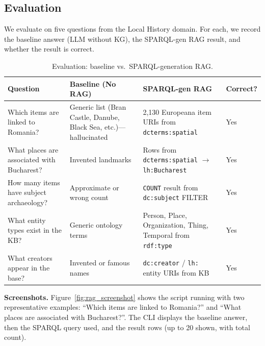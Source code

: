 \documentclass[11pt,a4paper]{article}
\begin{document}
  \subsection{Evaluation}

  We evaluate on five questions from the Local History domain. For each, we record the baseline answer (LLM without KG), the SPARQL-gen RAG result, and whether the result is correct.

  \begin{table}[ht]
  \centering
  \caption{Evaluation: baseline vs.\ SPARQL-generation RAG.}
  \begin{tabular}{p{3.8cm}p{3.2cm}p{3.8cm}l}
  \toprule
  \textbf{Question} & \textbf{Baseline (No RAG)} & \textbf{SPARQL-gen RAG} & \textbf{Correct?} \\
  \midrule
  Which items are linked to Romania? & Generic list (Bran Castle, Danube, Black Sea, etc.)---hallucinated & 2,130 Europeana item URIs from \texttt{dcterms:spatial} & Yes \\
  What places are associated with Bucharest? & Invented landmarks & Rows from \texttt{dcterms:spatial} $\rightarrow$ \texttt{lh:Bucharest} & Yes \\
  How many items have subject archaeology? & Approximate or wrong count & \texttt{COUNT} result from \texttt{dc:subject} FILTER & Yes \\
  What entity types exist in the KB? & Generic ontology terms & Person, Place, Organization, Thing, Temporal from \texttt{rdf:type} & Yes \\
  What creators appear in the base? & Invented or famous names & \texttt{dc:creator} / \texttt{lh:} entity URIs from KB & Yes \\
  \bottomrule
  \end{tabular}
  \end{table}

  \textbf{Screenshots.} Figure~\ref{fig:rag_screenshot} shows the script running with two representative examples: ``Which items are linked to Romania?'' and ``What places are associated with Bucharest?''. The CLI displays the baseline answer, then the SPARQL query used, and the result rows (up to 20 shown, with total count).
\end{document}
